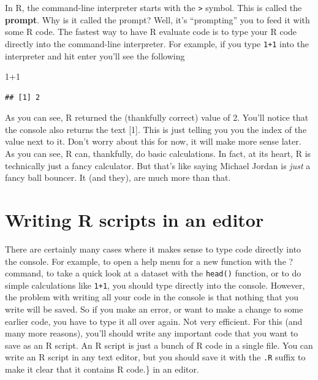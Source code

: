 \documentclass[
]{book}
\newenvironment{Shaded}{\begin{snugshade}}{\end{snugshade}}
\newcommand{\DecValTok}[1]{\textcolor[rgb]{0.00,0.00,0.81}{#1}}
\newcommand{\SpecialCharTok}[1]{\textcolor[rgb]{0.00,0.00,0.00}{#1}}
\begin{document}
In R, the command-line interpreter starts with the \texttt{\textgreater{}} symbol. This is called the \textbf{prompt}. Why is it called the prompt? Well, it's ``prompting'' you to feed it with some R code. The fastest way to have R evaluate code is to type your R code directly into the command-line interpreter. For example, if you type \texttt{1+1} into the interpreter and hit enter you'll see the following

\begin{Shaded}
\begin{Highlighting}[]
\DecValTok{1}\SpecialCharTok{+}\DecValTok{1}
\end{Highlighting}
\end{Shaded}

\begin{verbatim}
## [1] 2
\end{verbatim}

As you can see, R returned the (thankfully correct) value of 2. You'll notice that the console also returns the text {[}1{]}. This is just telling you you the index of the value next to it. Don't worry about this for now, it will make more sense later. As you can see, R can, thankfully, do basic calculations. In fact, at its heart, R is technically just a fancy calculator. But that's like saying Michael Jordan is \emph{just} a fancy ball bouncer. It (and they), are much more than that.

\hypertarget{writing-r-scripts-in-an-editor}{%
\section{Writing R scripts in an editor}\label{writing-r-scripts-in-an-editor}}

There are certainly many cases where it makes sense to type code directly into the console. For example, to open a help menu for a new function with the ? command, to take a quick look at a dataset with the \texttt{head()} function, or to do simple calculations like \texttt{1+1}, you should type directly into the console. However, the problem with writing all your code in the console is that nothing that you write will be saved. So if you make an error, or want to make a change to some earlier code, you have to type it all over again. Not very efficient. For this (and many more reasons), you'll should write any important code that you want to save as an R script. An R script is just a bunch of R code in a single file. You can write an R script in any text editor, but you should save it with the \texttt{.R} suffix to make it clear that it contains R code.\} in an editor.
\end{document}
